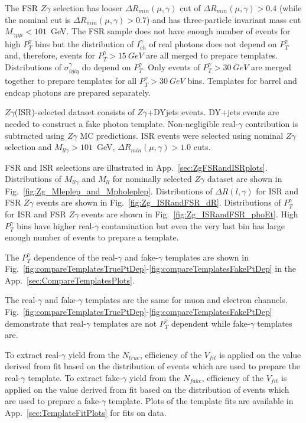 The FSR $Z\gamma$ selection has looser $\Delta R_{min}(\mu,\gamma)$ cut of $\Delta R_{min}(\mu,\gamma)>0.4$ (while the nominal cut is $\Delta R_{min}(\mu,\gamma)>0.7$) and has three-particle invariant mass cut $M_{\gamma\mu\mu}<101$~GeV. The FSR sample does not have enough number of events for high $P_{T}^{\gamma}$ bins but the distribution of $I_{ch}^{\gamma}$ of real photons does not depend on $P_{T}^{\gamma}$ and, therefore, events for $P_{T}^{\gamma}>15~GeV$ are all merged to prepare templates. Distributions of $\sigma_{i\eta i\eta}^{\gamma}$ do depend on $P_T^{\gamma}$. Only events of $P_T^{\gamma}>30~GeV$ are merged together to prepare templates for all $P_T^{\gamma}>30~GeV$ bins. Templates for barrel and endcap photons are prepared separately.

$Z\gamma$(ISR)-selected dataset consists of $Z\gamma$+DYjets events. DY+jets events are needed to construct a fake photon template. Non-negligible real-$\gamma$ contribution is subtracted using $Z\gamma$ MC predictions. ISR events were selected using nominal $Z\gamma$ selection and $M_{ll\gamma}>101$~GeV, $\Delta{R_{min}}(\mu,\gamma)>1.0$ cuts. 

FSR and ISR selections are illustrated in App.~\ref{sec:ZgFSRandISRplots}. Distributions of $M_{ll\gamma}$ and $M_{ll}$ for nominally selected $Z\gamma$ dataset are shown in Fig.~\ref{fig:Zg_Mleplep_and_Mpholeplep}. Distributions of $\Delta{R}(l,\gamma)$ for ISR and FSR $Z\gamma$ events are shown in Fig.~\ref{fig:Zg_ISRandFSR_dR}. Distributions of $P_{T}^{\gamma}$ for ISR and FSR $Z\gamma$ events are shown in Fig.~\ref{fig:Zg_ISRandFSR_phoEt}. High $P_{T}^{\gamma}$ bins have higher real-$\gamma$ contamination but even the very last bin has large enough number of events to prepare a template. 

The $P_{T}^{\gamma}$ dependence of the real-$\gamma$ and fake-$\gamma$ templates are shown in Fig.~\ref{fig:compareTemplatesTruePtDep}-\ref{fig:compareTemplatesFakePtDep} in the App.~\ref{sec:CompareTemplatesPlots}. 

The real-$\gamma$ and fake-$\gamma$ templates are the same for muon and electron channels. Fig.~\ref{fig:compareTemplatesTruePtDep}-\ref{fig:compareTemplatesFakePtDep} demonstrate that real-$\gamma$ templates are not $P_{T}^{\gamma}$ dependent while fake-$\gamma$ templates are.

To extract real-$\gamma$ yield from the $N_{true}$, efficiency of the $V_{fit}$ is applied on the value derived from fit based on the distribution of events which are used to prepare the real-$\gamma$ template. To extract fake-$\gamma$ yield from the $N_{fake}$, efficiency of the $V_{fit}$ is applied on the value derived from fit based on the distribution of events which are used to prepare a fake-$\gamma$ template. Plots of the template fits are available in App.~\ref{sec:TemplateFitPlots} for fits on data. 

